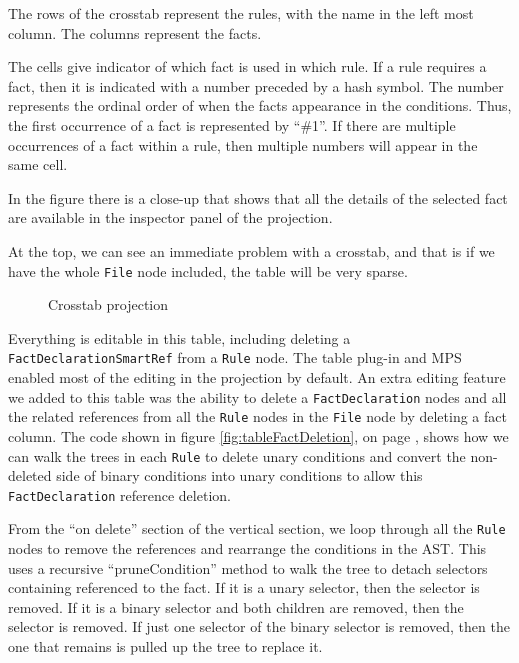The rows of the crosstab represent the rules, with the name in the left most column.
The columns represent the facts.

The cells give indicator of which fact is used in which rule.
If a rule requires a fact, then it is indicated with a number preceded by a hash symbol.
The number represents the ordinal order of when the facts appearance in the conditions.
Thus, the first occurrence of a fact is represented by ``\#1''.
If there are multiple occurrences of a fact within a rule, then multiple numbers will appear in the same cell.

In the figure there is a close-up that shows that all the details of the selected fact are available in the inspector panel of the projection.

At the top, we can see an immediate problem with a crosstab, and that is if we have the whole \texttt{File} node included, the table will be very sparse.

\begin{figure}
    \centering
    \caption{Crosstab projection}
    \label{fig:crosstabProjection1}
\end{figure}

Everything is editable in this table, including deleting a \texttt{FactDeclarationSmartRef} from a \texttt{Rule} node.
The table plug-in and MPS enabled most of the editing in the projection by default.
An extra editing feature we added to this table was the ability to delete a \texttt{FactDeclaration} nodes and all the related references from all the \texttt{Rule} nodes in the \texttt{File} node by deleting a fact column.
The code shown in figure \ref{fig:tableFactDeletion}, on page \pageref{fig:tableFactDeletion}, shows how we can walk the trees in each \texttt{Rule} to delete unary conditions and convert the non-deleted side of binary conditions into unary conditions to allow this \texttt{FactDeclaration} reference deletion.

From the ``on delete'' section of the vertical section, we loop through all the \texttt{Rule} nodes to remove the references and rearrange the conditions in the AST.
This uses a recursive ``pruneCondition'' method to walk the tree to detach selectors containing referenced to the fact.
If it is a unary selector, then the selector is removed.
If it is a binary selector and both children are removed, then the selector is removed.
If just one selector of the binary selector is removed, then the one that remains is pulled up the tree to replace it.

